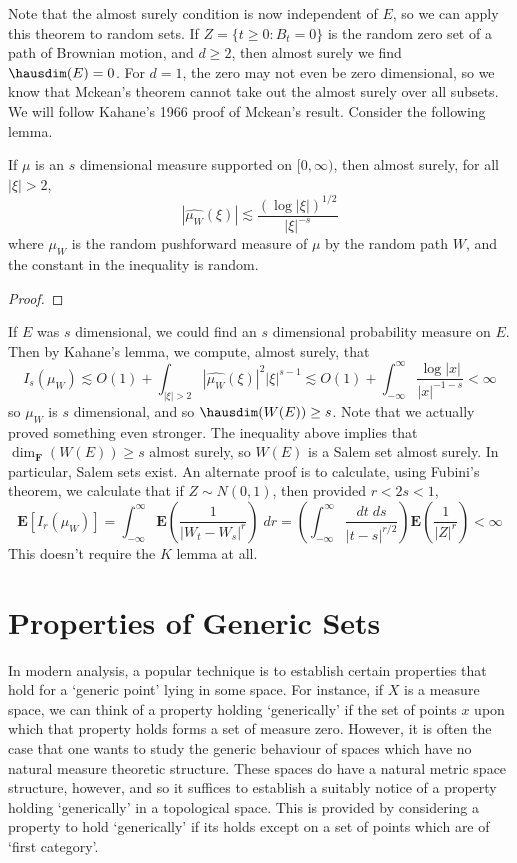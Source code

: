 Note that the almost surely condition is now independent of $E$, so we can apply this theorem to random sets. If $Z = \{ t \geq 0: B_t = 0 \}$ is the random zero set of a path of Brownian motion, and $d \geq 2$, then almost surely we find $\hausdim(E) = 0$. For $d = 1$, the zero may not even be zero dimensional, so we know that Mckean's theorem cannot take out the almost surely over all subsets. We will follow Kahane's 1966 proof of Mckean's result. Consider the following lemma.

\begin{lemma}
	If $\mu$ is an $s$ dimensional measure supported on $[0,\infty)$, then almost surely, for all $|\xi| > 2$,
	\[ |\widehat{\mu_W}(\xi)| \lesssim \frac{(\log |\xi|)^{1/2}}{|\xi|^{-s}} \]
	where $\mu_W$ is the random pushforward measure of $\mu$ by the random path $W$, and the constant in the inequality is random.
\end{lemma}
\begin{proof}
	
\end{proof}

If $E$ was $s$ dimensional, we could find an $s$ dimensional probability measure on $E$. Then by Kahane's lemma, we compute, almost surely, that
%
\[ I_s(\mu_W) \lesssim O(1) + \int_{|\xi| > 2} |\widehat{\mu_W}(\xi)|^2 |\xi|^{s-1} \lesssim O(1) + \int_{-\infty}^\infty \frac{\log |x|}{|x|^{-1-s}} < \infty \]
%
so $\mu_W$ is $s$ dimensional, and so $\hausdim(W(E)) \geq s$. Note that we actually proved something even stronger. The inequality above implies that $\dim_{\mathbf{F}}(W(E)) \geq s$ almost surely, so $W(E)$ is a Salem set almost surely. In particular, Salem sets exist. An alternate proof is to calculate, using Fubini's theorem, we calculate that if $Z \sim N(0,1)$, then provided $r < 2s < 1$,
	\[ \mathbf{E}[I_r(\mu_W)] = \int_{-\infty}^\infty \mathbf{E} \left( \frac{1}{|W_t - W_s|^r} \right)\; dr = \left( \int_{-\infty}^\infty \frac{dt\; ds}{|t-s|^{r/2}} \right) \mathbf{E} \left( \frac{1}{|Z|^r} \right) < \infty \]
	This doesn't require the $K$ lemma at all.

\chapter{Properties of Generic Sets}

In modern analysis, a popular technique is to establish certain properties that hold for a `generic point' lying in some space. For instance, if $X$ is a measure space, we can think of a property holding `generically' if the set of points $x$ upon which that property holds forms a set of measure zero. However, it is often the case that one wants to study the generic behaviour of spaces which have no natural measure theoretic structure. These spaces do have a natural metric space structure, however, and so it suffices to establish a suitably notice of a property holding `generically' in a topological space. This is provided by considering a property to hold `generically' if its holds except on a set of points which are of `first category'.

